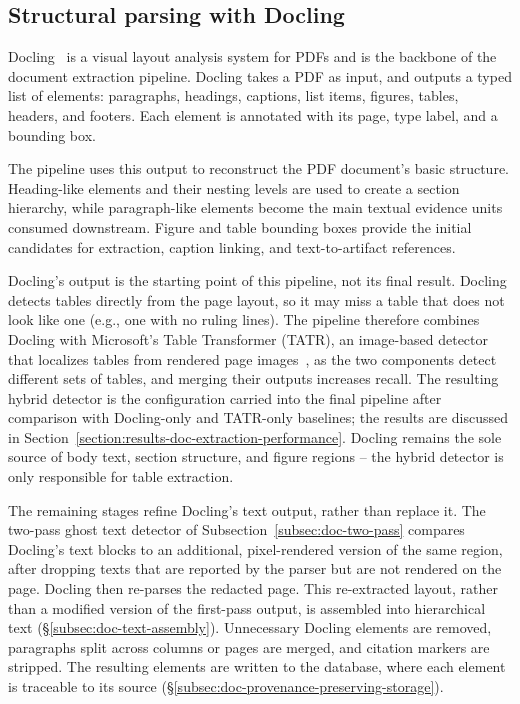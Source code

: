 \subsection{Structural parsing with Docling}\label{subsec:doc-parsing-with-docling}

Docling~\parencite{auer2024doclingtechnicalreport} is a visual layout analysis system for PDFs and is the backbone of the document extraction pipeline. Docling takes a PDF as input, and outputs a typed list of elements: paragraphs, headings, captions, list items, figures, tables, headers, and footers. Each element is annotated with its page, type label, and a bounding box. 

The pipeline uses this output to reconstruct the PDF document's basic structure. Heading-like elements and their nesting levels are used to create a section hierarchy, while paragraph-like elements become the main textual evidence units consumed downstream. Figure and table bounding boxes provide the initial candidates for extraction, caption linking, and text-to-artifact references. 

Docling's output is the starting point of this pipeline, not its final result. Docling detects tables directly from the page layout, so it may miss a table that does not look like one (e.g., one with no ruling lines). The pipeline therefore combines Docling with Microsoft's Table Transformer (TATR), an image-based detector that localizes tables from rendered page images~\parencite{smock2022pubtables1mcomprehensivetable}, as the two components detect different sets of tables, and merging their outputs increases recall. The resulting hybrid detector is the configuration carried into the final pipeline after comparison with Docling-only and TATR-only baselines; the results are discussed in Section~\ref{section:results-doc-extraction-performance}. Docling remains the sole source of body text, section structure, and figure regions -- the hybrid detector is only responsible for table extraction.

The remaining stages refine Docling's text output, rather than replace it. The two-pass ghost text detector of Subsection~\ref{subsec:doc-two-pass} compares Docling's text blocks to an additional, pixel-rendered version of the same region, after dropping texts that are reported by the parser but are not rendered on the page. Docling then re-parses the redacted page. This re-extracted layout, rather than a modified version of the first-pass output, is assembled into hierarchical text (§\ref{subsec:doc-text-assembly}). Unnecessary Docling elements are removed, paragraphs split across columns or pages are merged, and citation markers are stripped. The resulting elements are written to the database, where each element is traceable to its source (§\ref{subsec:doc-provenance-preserving-storage}).